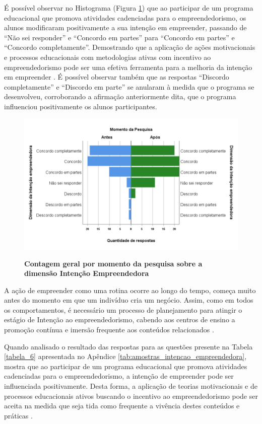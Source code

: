É possível observar no Histograma (Figura \ref{figura_45}) que ao participar de um programa educacional que promova atividades cadenciadas para o empreendedorismo, os alunos modificaram positivamente a sua intenção em empreender, passando de “Não sei responder” e “Concordo em partes” para “Concordo em partes” e “Concordo completamente”. Demostrando que a aplicação de ações motivacionais e processos educacionais com metodologias ativas  com incentivo ao empreendedorismo pode ser uma efetiva ferramenta para a melhoria da intenção em empreender \cite{fayolle_beyond_2014}. É possível observar também que as respostas “Discordo completamente” e “Discordo em parte” se anularam à medida que o programa se desenvolveu, corroborando a afirmação anteriormente dita, que o programa influenciou positivamente os alunos participantes.


\begin{figure}[H]
\centering
\caption{\textbf{Contagem geral por momento da pesquisa sobre a dimensão Intenção Empreendedora}}
\includegraphics[scale=0.4]{Imagens/dimensao_empreendedora.png}
\label{figura_45}
\end{figure}


A ação de empreender como uma rotina ocorre ao longo do tempo, começa muito antes do momento em que um indivíduo cria um negócio. Assim, como em todos os comportamentos, é necessário um processo de planejamento para atingir o estágio de Intenção ao empreendedorismo, cabendo aos centros de ensino a promoção contínua e imersão frequente aos conteúdos relacionados \cite{garcia-rodriguez_entrepreneurial_2017}.

Quando analisado o resultado das respostas para as questões presente na Tabela \ref{tabela_6} apresentada no Apêndice \ref{tab:amostras_intencao_empreendedora}, mostra que ao participar de um programa educacional que promova atividades cadenciadas para o empreendedorismo, a intenção de empreender pode ser influenciada positivamente. Desta forma, a aplicação de teorias motivacionais e de processos educacionais ativos buscando o incentivo ao empreendedorismo pode ser aceita na medida que seja tida como frequente a vivência destes conteúdos e práticas \cite{fayolle_beyond_2014}.

